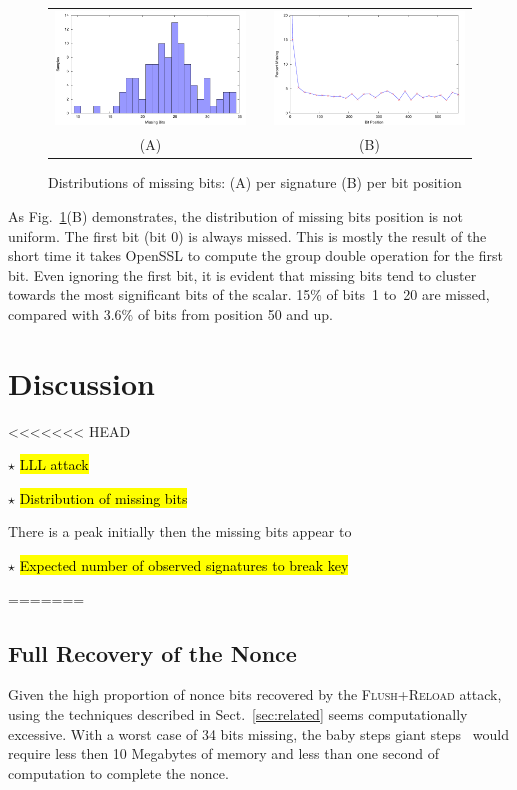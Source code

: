 \documentclass{llncs}
\newcommand{\starpar}[1]{\par{\footnotesize $\star$ \hl{#1}\par}}
\begin{document}
\begin{figure}[htb]
\begin{tabular}{ccc}
\includegraphics[width=2.4in]{images/missing} &\hfill &\includegraphics[width=2.4in]{images/positions}\\
(A)& & (B)
\end{tabular}
\caption{Distributions of missing bits: (A) per signature (B) per bit position\label{dgm:dist}}
\end{figure}

As Fig.~\ref{dgm:dist}(B) demonstrates, the distribution of missing bits position is not uniform.
The first bit (bit 0) is always missed.
This is mostly the result of the short time it takes OpenSSL to compute the group double operation for the first bit.
Even ignoring the first bit, it is evident that missing bits tend to cluster towards the most significant bits of the
scalar.
15\% of bits~1 to~20 are missed, compared with 3.6\% of bits from position 50 and up.





\section{Discussion}\label{sec:discussion}
<<<<<<< HEAD
\starpar{LLL attack}
\starpar{Distribution of missing bits} There is a peak initially then the missing bits appear to 
\starpar{Expected number of observed signatures to break key}
=======

\subsection{Full Recovery of the Nonce}\label{sub:full_nonce}
Given the high proportion of nonce bits recovered by the \textsc{Flush+Reload} attack, using the techniques
described in Sect.~\ref{sec:related} seems computationally excessive. 
With a worst case of 34 bits missing, the baby steps giant steps~\cite{shanks71class} would require less then 10 Megabytes of memory
and less than one second of computation to complete the nonce.
\end{document}
